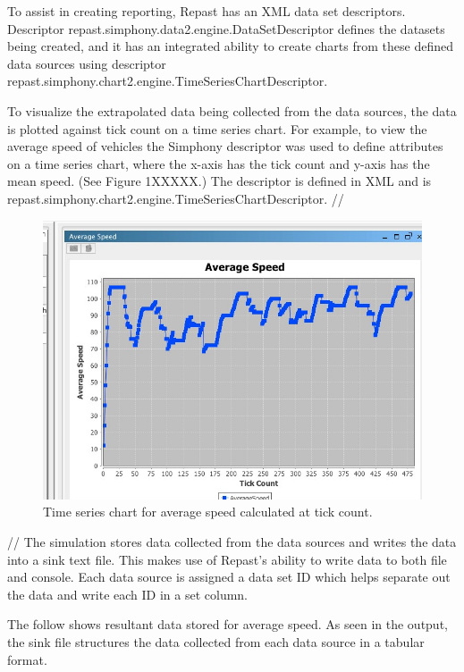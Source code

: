 \documentclass[11pt]{article}
\begin{document}
\begin{enumerate}
To assist in creating reporting, Repast has an XML data set descriptors. Descriptor repast.simphony.data2.engine.DataSetDescriptor defines the datasets being created, and it has an integrated ability to create charts from these defined data sources using descriptor repast.simphony.chart2.engine.TimeSeriesChartDescriptor.

To visualize the extrapolated data being collected from the data sources, the data is plotted against tick count on a time series chart. For example, to view the average speed of vehicles the Simphony descriptor was used to define attributes on a time series chart, where the x-axis has the tick count and y-axis has the mean speed. (See Figure 1XXXXX.) The descriptor is defined in XML and is repast.simphony.chart2.engine.TimeSeriesChartDescriptor.
// 

\begin{figure}[h!]
\begin{center}
\includegraphics[scale=0.5]{Avg_Speed}
\caption{Time series chart for average speed calculated at tick count.}
\end{center}
\end{figure}

//
The simulation stores data collected from the data sources and writes the data into a sink text file. This makes use of Repast’s ability to write data to both file and console. Each data source is assigned a data set ID which helps separate out the data and write each ID in a set column. 

The follow shows resultant data stored for average speed. As seen in the output, the sink file structures the data collected from each data source in a tabular format. 


\end{enumerate}
\end{document}
